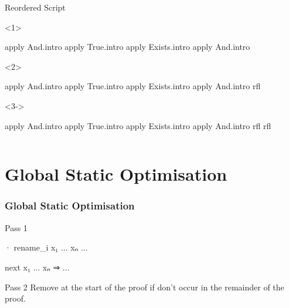 \begin{frame}[fragile]
\begin{columns}[onlytextwidth,t]
    \begin{column}{.38\textwidth}
      \begin{block}{Reordered Script}
        \begin{onlyenv}<1>
          \begin{leancode}
            apply And.intro
            apply True.intro
            apply Exists.intro
            apply And.intro


          \end{leancode}
        \end{onlyenv}
        \begin{onlyenv}<2>
          \begin{leancode}[highlightlines=5]
            apply And.intro
            apply True.intro
            apply Exists.intro
            apply And.intro
            rfl

          \end{leancode}
        \end{onlyenv}
        \begin{onlyenv}<3->
          \begin{leancode}[highlightlines=6]
            apply And.intro
            apply True.intro
            apply Exists.intro
            apply And.intro
            rfl
            rfl
          \end{leancode}
        \end{onlyenv}
      \end{block}
    \end{column}
  \end{columns}
\end{frame}

\section{Global Static Optimisation}

\begin{frame}[fragile]
  \frametitle{Global Static Optimisation}

  \begin{block}{Pass 1}
    \medskip
    \begin{minipage}{.4\textwidth}
      \begin{leancode}
        · rename_i x₁ ... xₙ
          ...
      \end{leancode}
    \end{minipage}
    \Longrightarrow
    \begin{minipage}{.4\textwidth}
      \begin{leancode}
        next x₁ ... xₙ ⇒ ...
      \end{leancode}
    \end{minipage}
  \end{block}

  \pause\bigskip

  \begin{block}{Pass 2}
    Remove  at the start of the proof if  don't occur in the remainder of the proof.
  \end{block}
\end{frame}

\begin{frame}
\end{frame}


